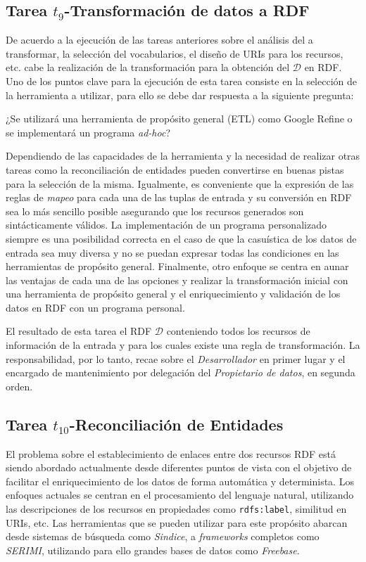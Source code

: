 \subsection{Tarea $t_9$-Transformación de datos a RDF}
De acuerdo a la ejecución de las tareas anteriores sobre el análisis 
del \dataset a transformar, la selección del vocabularios, el diseño 
de \gls{URI}s para los recursos, etc. cabe la realización de la transformación 
para la obtención del \dataset $\mathcal{D}$ en \gls{RDF}. Uno de los puntos 
clave para la ejecución de esta tarea consiste en la selección de la 
herramienta a utilizar, para ello se debe dar respuesta a la siguiente pregunta:

¿Se utilizará una herramienta de propósito general (\gls{ETL}) como Google \gls{Refine} o se 
implementará un programa \textit{ad-hoc}?

Dependiendo de las capacidades de la herramienta y la necesidad de realizar otras tareas como 
la reconciliación de entidades pueden convertirse en buenas pistas para la selección de la misma. Igualmente, 
es conveniente que la expresión de las reglas de \textit{mapeo} para cada una de las tuplas de 
entrada y su conversión en RDF sea lo más sencillo posible asegurando que los recursos 
generados son sintácticamente válidos. La implementación de un programa personalizado siempre 
es una posibilidad correcta en el caso de que la casuística de los datos de entrada sea 
muy diversa y no se puedan expresar todas las condiciones en las herramientas de propósito general. Finalmente, 
otro enfoque se centra en aunar las ventajas de cada una de las opciones y realizar la transformación 
inicial con una herramienta de propósito general y el enriquecimiento y validación de los datos en RDF
con un programa personal. 

El resultado de esta tarea el \dataset RDF  $\mathcal{D}$ conteniendo todos los recursos de información 
de la entrada y para los cuales existe una regla de transformación. La responsabilidad, por lo tanto, 
recae sobre el \textit{Desarrollador} en primer lugar y el encargado de mantenimiento por delegación del \textit{Propietario de datos}, 
en segunda orden. 

\subsection{Tarea $t_{10}$-Reconciliación de Entidades}
El problema sobre el establecimiento de enlaces entre dos recursos \gls{RDF} está siendo
abordado actualmente desde diferentes puntos de vista con el objetivo de facilitar
el enriquecimiento de los datos de forma automática y determinista. Los enfoques
actuales se centran en el procesamiento del lenguaje natural, utilizando
las descripciones de los recursos en propiedades como \texttt{rdfs:label}, similitud
en \gls{URI}s, etc. Las herramientas que se pueden utilizar para este propósito abarcan desde
sistemas de búsqueda como \textit{Sindice}, a \textit{frameworks} completos como \textit{SERIMI}, utilizando
para ello grandes bases de datos como \textit{Freebase}.

